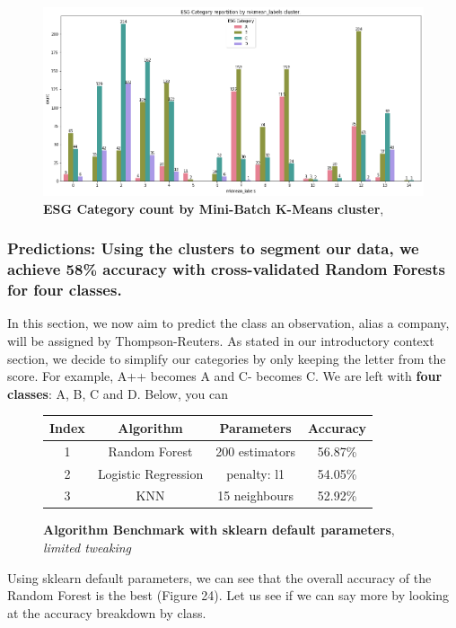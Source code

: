 \documentclass[12pt]{report}
\begin{document}
\begin{figure}[h!]
\centering
\includegraphics[scale=0.3]{ESG_cat_mkmeans.png}
\caption{\textbf{ESG Category count by Mini-Batch K-Means cluster}, }
\label{fig:mkmeans_esg}
\end{figure}

\subsubsection{Predictions: Using the clusters to segment our data, we achieve 58\% accuracy with cross-validated Random Forests for four classes.}
In this section, we now aim to predict the class an observation, alias a company, will be assigned by Thompson-Reuters.\newline
As stated in our introductory context section, we decide to simplify our categories by only keeping the letter from the score. For example, A++ becomes A and C- becomes C. We are left with \textbf{four classes}: A, B, C and D.\newline
Below, you can 
\begin{figure}[h!]
\begin{center}
\begin{tabular}{ |c|c|c|c| }
\hline
 Index & Algorithm & Parameters & Accuracy \\
 \hline\hline
 1 & Random Forest & 200 estimators & 56.87\% \\  
 2 & Logistic Regression & penalty: l1 & 54.05\% \\
 3 & KNN & 15 neighbours & 52.92\% \\
\hline
\end{tabular}
\end{center}
\caption{\textbf{Algorithm Benchmark with sklearn default parameters}, \textit{limited tweaking}}
\label{fig:benchmark}
\end{figure}

Using sklearn default parameters, we can see that the overall accuracy of the Random Forest is the best (Figure 24). Let us see if we can say more by looking at the accuracy breakdown by class.
\end{document}
